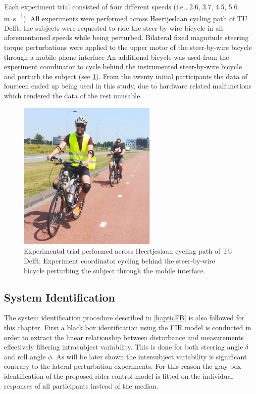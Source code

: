 Each experiment trial consisted of four different speeds (i.e., 2.6, 3.7, 4.5, 5.6 \si{\meter\per s}). All experiments were performed across Heertjeslaan cycling path of TU Delft, the subjects were requested to ride the steer-by-wire bicycle in all aforementioned speeds while being  perturbed. Bilateral fixed magnitude steering torque  perturbations were applied to the upper motor of the steer-by-wire bicycle through a mobile phone interface  An additional bicycle was used from the experiment coordinator to cycle behind  the instrumented steer-by-wire bicycle and perturb the subject (see \cref{steerexperiment}). From the twenty initial participants the data of fourteen ended up being used in this study, due to hardware related malfunctions which rendered the data of the rest unusable.
\begin{figure}[!h]
    \centering
    \includegraphics [width=0.6\textwidth]{images/steer_irf/steer_exp.png}
    \caption{Experimental trial performed across Heertjeslaan cycling path of TU Delft; Experiment coordinator cycling behind the steer-by-wire bicycle perturbing the subject through the mobile interface.}
    \label{steerexperiment}
    \end{figure}
\subsection{System Identification} 
The system identification procedure described in \cref{hapticFB} is also followed for this chapter. First a black box identification using the FIR model is conducted in order to  extract the linear relationship between disturbance and measurements effectively filtering intrasubject variability. This is done for both steering angle \ensuremath{\delta} and roll angle \ensuremath{\phi}. As will be later shown the intersubject variability is significant contrary to the lateral perturbation experiments. For this reason the gray box identification of the proposed rider control model is fitted on the individual responses of all participants instead of the median.
